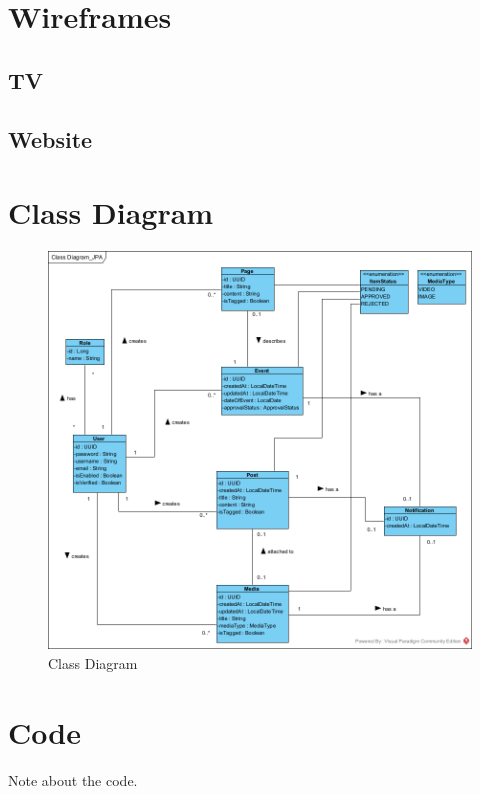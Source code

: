 \documentclass{article}
\begin{document}
\section{Wireframes}
\subsection{TV}

\subsection{Website}
\section{Class Diagram}
\begin{figure}[H]
    \centering
    \includegraphics[width=.98\textwidth]{images/ClassDiagram.png}
    \centering
    \caption{Class Diagram}
\end{figure}%
\section{Code}
Note about the code.
\end{document}
